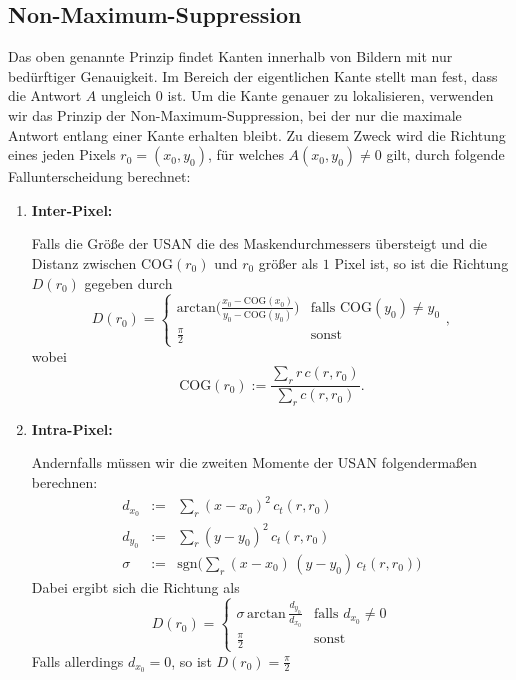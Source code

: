 \documentclass[a4paper, 11pt]{report}
\theoremstyle{definition}
\begin{document}
		\subsection{Non-Maximum-Suppression}\label{ssec:nonmax}
			Das oben genannte Prinzip findet Kanten innerhalb von Bildern mit nur bedürftiger Genauigkeit. Im Bereich der eigentlichen Kante stellt man fest, dass die Antwort $A$ ungleich $0$ ist.
			Um die Kante genauer zu lokalisieren, verwenden wir das Prinzip der Non-Maximum-Suppression, bei der nur die maximale Antwort entlang einer Kante erhalten bleibt.
			Zu diesem Zweck wird die Richtung eines jeden Pixels $r_0 = (x_0, y_0)$, für welches $A(x_0, y_0) \neq 0$ gilt, durch folgende Fallunterscheidung berechnet:
			\begin{enumerate}
				\item \textbf{Inter-Pixel:}

				\noindent Falls die Größe der USAN die des Maskendurchmessers übersteigt und die Distanz zwischen $\text{COG}(r_0)$ und $r_0$ größer als $1$ Pixel ist, so ist die Richtung $D(r_0)$ gegeben durch
				$$ D(r_0) = \begin{cases}
					\text{arctan}\bigg(
						\frac{x_0 - \text{COG}(x_0)}
						{y_0 - \text{COG}(y_0)}
					\bigg) & \text{falls } \text{COG}(y_0) \neq y_0 \\
					
					\frac{\pi}{2} & \text{sonst}

				\end{cases}, $$
				wobei
				$$ \text{COG}(r_0) := \frac	{\sum_r r\,c(r,r_0)}	{\sum_r c(r,r_0)}. $$
				\item \textbf{Intra-Pixel:}
				
				\noindent Andernfalls müssen wir die zweiten Momente der USAN folgendermaßen berechnen:
				\begin{eqnarray*}
					d_{x_0} &:=& \sum_r (x-x_0)^2 \, c_t(r,r_0) \\
					d_{y_0} &:=& \sum_r (y-y_0)^2 \, c_t(r,r_0) \\
					\sigma 	&:=& \text{sgn}\bigg(\sum_r (x-x_0) \, (y-y_0) \, c_t(r,r_0)\bigg)
				\end{eqnarray*}
				Dabei ergibt sich die Richtung als
				$$ D(r_0) = \begin{cases}
						\sigma \, \text{arctan} \, \frac{d_{y_0}}{d_{x_0}} 	&	\text{falls } d_{x_0} \neq 0 \\ 
						\frac{\pi}{2}										&	\text{sonst}
					\end{cases}$$
				Falls allerdings $d_{x_0} = 0$, so ist $D(r_0) = \frac{\pi}{2}$
			\end{enumerate}
\end{document}
